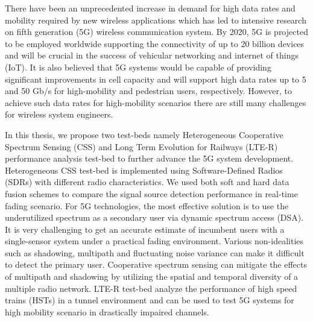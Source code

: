 There have been an unprecedented increase in demand for high data rates and mobility required by new wireless applications which has led to intensive research on fifth generation (5G) wireless communication system. By 2020, 5G is projected to be employed worldwide supporting the connectivity of up to 20 billion devices and will be crucial in the success of vehicular networking and internet of things (IoT). It is also believed that 5G systems would be capable of providing significant improvements in cell capacity and will support high data rates up to 5 and 50 Gb/s for high-mobility and pedestrian users, respectively. However, to achieve such data rates for high-mobility scenarios there are still many challenges for wireless system engineers.  

In this thesis, we propose two test-beds namely Heterogeneous Cooperative Spectrum Sensing (CSS) and Long Term Evolution for Railways (LTE-R) performance analysis test-bed to further advance the 5G system development. Heterogeneous CSS test-bed is implemented using Software-Defined Radios (SDRs) with different radio characteristics. We used both soft and hard data fusion schemes to compare the signal source detection performance in real-time fading scenario. For 5G technologies, the most effective solution is to use the underutilized spectrum as a secondary user via dynamic spectrum access (DSA). It is very challenging to get an accurate estimate of incumbent users with a single-sensor system under a practical fading environment. Various non-idealities such as shadowing, multipath and fluctuating noise variance can make it difficult to detect the primary user. Cooperative spectrum sensing can mitigate the effects of multipath and shadowing by utilizing the spatial and temporal diversity of a multiple radio network. LTE-R test-bed analyze the performance of high speed trains (HSTs) in a tunnel environment and can be used to test 5G systems for high mobility scenario in drastically impaired channels.

